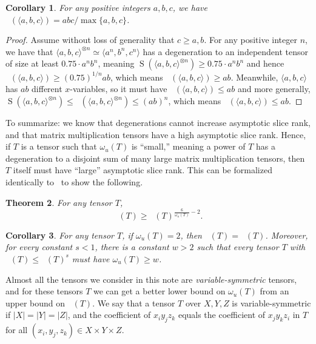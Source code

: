 \documentclass[11pt]{article}
\numberwithin{equation}{section}
\newtheorem{theorem}{Theorem}[section]
\newtheorem{corollary}[theorem]{Corollary}
\theoremstyle{definition}
\theoremstyle{plain}
\newcommand{\sr}{\mathop{\operatorname{S}}}
\newcommand{\xr}{\mathop{\operatorname{S_x}}}
\newcommand{\trr}{\mathop{\tilde{\operatorname{R}}}}
\newcommand{\tsr}{\mathop{\tilde{\operatorname{S}}}}
\theoremstyle{definition}
\begin{document}
\begin{corollary} \label{cortopropthree}
For any positive integers $a,b,c$, we have $\tsr(\langle a,b,c \rangle) = abc / \max \{a,b,c\}$.
\end{corollary}
\begin{proof}
Assume without loss of generality that $c \geq a,b$. For any positive integer $n$, we have that $\langle a,b,c \rangle^{\otimes n} \simeq \langle a^n, b^n, c^n \rangle$ has a degeneration to an independent tensor of size at least $0.75 \cdot a^n b^n$, meaning $\sr(\langle a,b,c \rangle^{\otimes n}) \geq 0.75 \cdot a^n b^n$ and hence $\tsr(\langle a,b,c \rangle) \geq (0.75)^{1/n} ab$, which means $\tsr(\langle a,b,c \rangle) \geq  ab$. Meanwhile, $\langle a,b,c \rangle$ has $ab$ different $x$-variables, so it must have $\xr(\langle a,b,c \rangle) \leq ab$ and more generally, $\sr(\langle a,b,c \rangle^{\otimes n}) \leq \xr(\langle a,b,c \rangle^{\otimes n}) \leq (ab)^n$, which means $\tsr(\langle a,b,c \rangle) \leq  ab$.
\end{proof}

To summarize: we know that degenerations cannot increase asymptotic slice rank, and that matrix multiplication tensors have a high asymptotic slice rank. Hence, if $T$ is a tensor such that $\omega_u(T)$ is ``small,'' meaning a power of $T$ has a degeneration to a disjoint sum of many large matrix multiplication tensors, then $T$ itself must have ``large'' asymptotic slice rank. This can be formalized identically to~\cite[Theorem~4.1 and Corollary~4.3]{aw}
%
to show the following.

\begin{theorem} \label{thm:SROmega}
For any tensor $T$, $$\tsr(T) \geq \trr(T)^{\frac{6}{\omega_u(T)} - 2}.$$
\end{theorem}

\begin{corollary} \label{cor:omegaands}
For any tensor $T$, if $\omega_u(T)=2$, then $\tsr(T) = \trr(T)$. Moreover, for every constant $s<1$, there is a constant $w>2$ such that every tensor $T$ with $\tsr(T) \leq \trr(T)^s$ must have $\omega_u(T) \geq w$.
\end{corollary}

Almost all the tensors we consider in this note are \emph{variable-symmetric} tensors, and for these tensors $T$ we can get a better lower bound on $\omega_u(T)$ from an upper bound on $\tsr(T)$. We say that a tensor $T$ over $X,Y,Z$ is variable-symmetric if $|X|=|Y|=|Z|$, and the coefficient of $x_i y_j z_k$ equals the coefficient of $x_j y_k z_i$ in $T$ for all $(x_i, y_j, z_k) \in X \times Y \times Z$.
\end{document}
